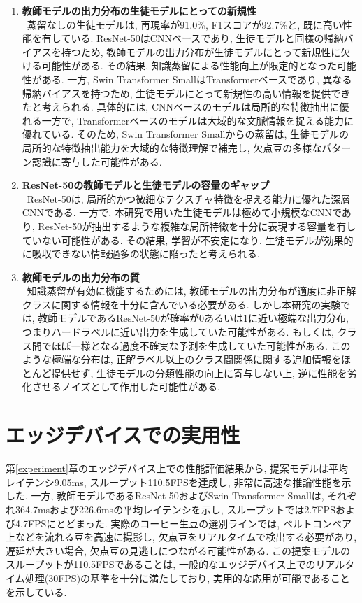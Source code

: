 \begin{enumerate}
  \item \textbf{教師モデルの出力分布の生徒モデルにとっての新規性}\\
  ~\indent 蒸留なしの生徒モデルは, 再現率が91.0\%, F1スコアが92.7\%と, 既に高い性能を有している.
  ResNet-50はCNNベースであり, 生徒モデルと同様の帰納バイアスを持つため, 教師モデルの出力分布が生徒モデルにとって新規性に欠ける可能性がある.
  その結果, 知識蒸留による性能向上が限定的となった可能性がある. 
  一方, Swin Transformer SmallはTransformerベースであり, 異なる帰納バイアスを持つため, 生徒モデルにとって新規性の高い情報を提供できたと考えられる.
  具体的には, CNNベースのモデルは局所的な特徴抽出に優れる一方で, Transformerベースのモデルは大域的な文脈情報を捉える能力に優れている.
  そのため, Swin Transformer Smallからの蒸留は, 生徒モデルの局所的な特徴抽出能力を大域的な特徴理解で補完し, 欠点豆の多様なパターン認識に寄与した可能性がある.
  \item \textbf{ResNet-50の教師モデルと生徒モデルの容量のギャップ}\\
  ~\indent ResNet-50は, 局所的かつ微細なテクスチャ特徴を捉える能力に優れた深層CNNである. 
  一方で, 本研究で用いた生徒モデルは極めて小規模なCNNであり, ResNet-50が抽出するような複雑な局所特徴を十分に表現する容量を有していない可能性がある. 
  その結果, 学習が不安定になり, 生徒モデルが効果的に吸収できない情報過多の状態に陥ったと考えられる.
  \item \textbf{教師モデルの出力分布の質}\\
  ~\indent 知識蒸留が有効に機能するためには, 教師モデルの出力分布が適度に非正解クラスに関する情報を十分に含んでいる必要がある. 
  しかし本研究の実験では, 教師モデルであるResNet-50が確率が0あるいは1に近い極端な出力分布, つまりハードラベルに近い出力を生成していた可能性がある. 
  もしくは, クラス間でほぼ一様となる過度不確実な予測を生成していた可能性がある. 
  このような極端な分布は, 正解ラベル以上のクラス間関係に関する追加情報をほとんど提供せず, 生徒モデルの分類性能の向上に寄与しない上, 逆に性能を劣化させるノイズとして作用した可能性がある. 
\end{enumerate}

\section{エッジデバイスでの実用性}
第\ref{experiment}章のエッジデバイス上での性能評価結果から, 提案モデルは平均レイテンシ9.05ms, スループット110.5FPSを達成し, 非常に高速な推論性能を示した. 
一方, 教師モデルであるResNet-50およびSwin Transformer Smallは, それぞれ364.7msおよび226.6msの平均レイテンシを示し, スループットでは2.7FPSおよび4.7FPSにとどまった.
実際のコーヒー生豆の選別ラインでは, ベルトコンベア上などを流れる豆を高速に撮影し, 欠点豆をリアルタイムで検出する必要があり, 遅延が大きい場合, 欠点豆の見逃しにつながる可能性がある. 
この提案モデルのスループットが110.5FPSであることは, 一般的なエッジデバイス上でのリアルタイム処理(30FPS)の基準を十分に満たしており, 実用的な応用が可能であることを示している. 

